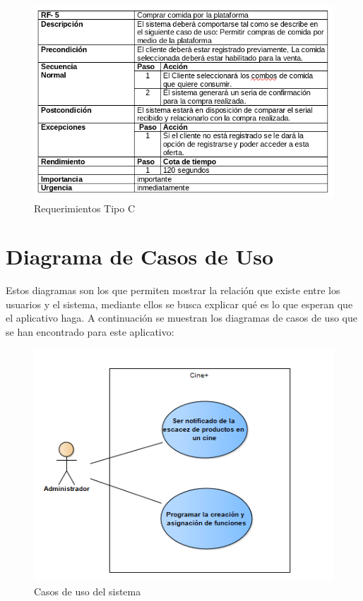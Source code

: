 \newpage
\begin{figure}[h!]
\centering
\includegraphics[width=.8\linewidth]{diseno/requerimientos/imgs/casos5}
	\caption{Requerimientos Tipo C}
\end{figure}
\newpage

\section{Diagrama de Casos de Uso}
Estos diagramas son los que permiten mostrar la relación que existe entre los usuarios y el sistema, mediante ellos se busca explicar qué es lo que esperan que el aplicativo haga. A continuación se muestran los diagramas de casos de uso que se han encontrado para este aplicativo:

\begin{figure}[h!]
	\centering
\includegraphics[width=.6\linewidth]{diseno/requerimientos/imgs/casosUso1}
	\caption{Casos de uso del sistema}
\end{figure}

